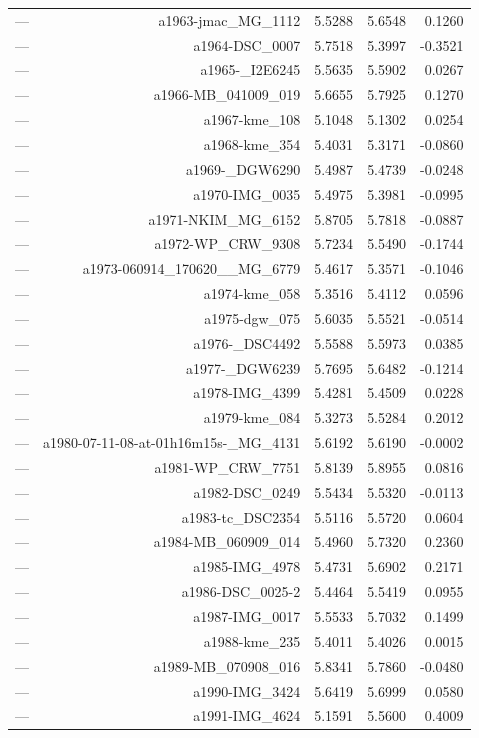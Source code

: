 \begin{table}[htbp]
\begin{tabular}{lrrrr}
— & a1963-jmac_MG_1112 & 5.5288 & 5.6548 & 0.1260 \\
— & a1964-DSC_0007 & 5.7518 & 5.3997 & -0.3521 \\
— & a1965-_I2E6245 & 5.5635 & 5.5902 & 0.0267 \\
— & a1966-MB_041009_019 & 5.6655 & 5.7925 & 0.1270 \\
— & a1967-kme_108 & 5.1048 & 5.1302 & 0.0254 \\
— & a1968-kme_354 & 5.4031 & 5.3171 & -0.0860 \\
— & a1969-_DGW6290 & 5.4987 & 5.4739 & -0.0248 \\
— & a1970-IMG_0035 & 5.4975 & 5.3981 & -0.0995 \\
— & a1971-NKIM_MG_6152 & 5.8705 & 5.7818 & -0.0887 \\
— & a1972-WP_CRW_9308 & 5.7234 & 5.5490 & -0.1744 \\
— & a1973-060914_170620__MG_6779 & 5.4617 & 5.3571 & -0.1046 \\
— & a1974-kme_058 & 5.3516 & 5.4112 & 0.0596 \\
— & a1975-dgw_075 & 5.6035 & 5.5521 & -0.0514 \\
— & a1976-_DSC4492 & 5.5588 & 5.5973 & 0.0385 \\
— & a1977-_DGW6239 & 5.7695 & 5.6482 & -0.1214 \\
— & a1978-IMG_4399 & 5.4281 & 5.4509 & 0.0228 \\
— & a1979-kme_084 & 5.3273 & 5.5284 & 0.2012 \\
— & a1980-07-11-08-at-01h16m15s-_MG_4131 & 5.6192 & 5.6190 & -0.0002 \\
— & a1981-WP_CRW_7751 & 5.8139 & 5.8955 & 0.0816 \\
— & a1982-DSC_0249 & 5.5434 & 5.5320 & -0.0113 \\
— & a1983-tc_DSC2354 & 5.5116 & 5.5720 & 0.0604 \\
— & a1984-MB_060909_014 & 5.4960 & 5.7320 & 0.2360 \\
— & a1985-IMG_4978 & 5.4731 & 5.6902 & 0.2171 \\
— & a1986-DSC_0025-2 & 5.4464 & 5.5419 & 0.0955 \\
— & a1987-IMG_0017 & 5.5533 & 5.7032 & 0.1499 \\
— & a1988-kme_235 & 5.4011 & 5.4026 & 0.0015 \\
— & a1989-MB_070908_016 & 5.8341 & 5.7860 & -0.0480 \\
— & a1990-IMG_3424 & 5.6419 & 5.6999 & 0.0580 \\
— & a1991-IMG_4624 & 5.1591 & 5.5600 & 0.4009 \\

\end{tabular}
\end{table}
